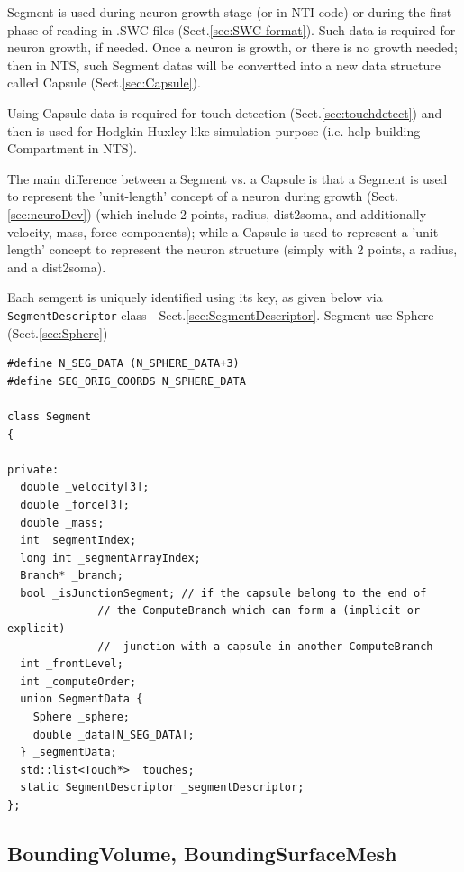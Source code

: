 Segment is used during neuron-growth stage (or in NTI code) or during the first
phase of reading in .SWC files (Sect.\ref{sec:SWC-format}). Such data is
required for neuron growth, if needed. Once a neuron is growth, or there is no
growth needed; then in NTS, such Segment datas will be convertted into a new
data structure called Capsule (Sect.\ref{sec:Capsule}).

Using Capsule data is required for touch detection (Sect.\ref{sec:touchdetect})
and then is used for Hodgkin-Huxley-like simulation purpose (i.e. help building
Compartment in NTS).

\begin{mdframed}
The main difference between a Segment vs. a Capsule is that a Segment is used to
represent the 'unit-length' concept of a neuron during growth
(Sect.\ref{sec:neuroDev}) (which include 2 points, radius, dist2soma, and
additionally velocity, mass, force components); while a Capsule is used to
represent a 'unit-length' concept to represent the neuron structure (simply with
2 points, a radius, and a dist2soma).
\end{mdframed}


Each semgent is uniquely identified using its key, as given below 
via \verb!SegmentDescriptor! class - Sect.\ref{sec:SegmentDescriptor}.
Segment use Sphere (Sect.\ref{sec:Sphere})
{\small
\begin{lstlisting}
#define N_SEG_DATA (N_SPHERE_DATA+3)
#define SEG_ORIG_COORDS N_SPHERE_DATA

class Segment
{

private:
  double _velocity[3];
  double _force[3];
  double _mass;
  int _segmentIndex;
  long int _segmentArrayIndex;
  Branch* _branch;
  bool _isJunctionSegment; // if the capsule belong to the end of 
              // the ComputeBranch which can form a (implicit or explicit) 
              //  junction with a capsule in another ComputeBranch 
  int _frontLevel;
  int _computeOrder;
  union SegmentData {
    Sphere _sphere;
    double _data[N_SEG_DATA];
  } _segmentData;
  std::list<Touch*> _touches;
  static SegmentDescriptor _segmentDescriptor;
};

\end{lstlisting}
}


\subsection{BoundingVolume, BoundingSurfaceMesh}
\label{sec:BoundingVolume-NTI}
\label{sec:BoundingSurfacemesh-NTI}

